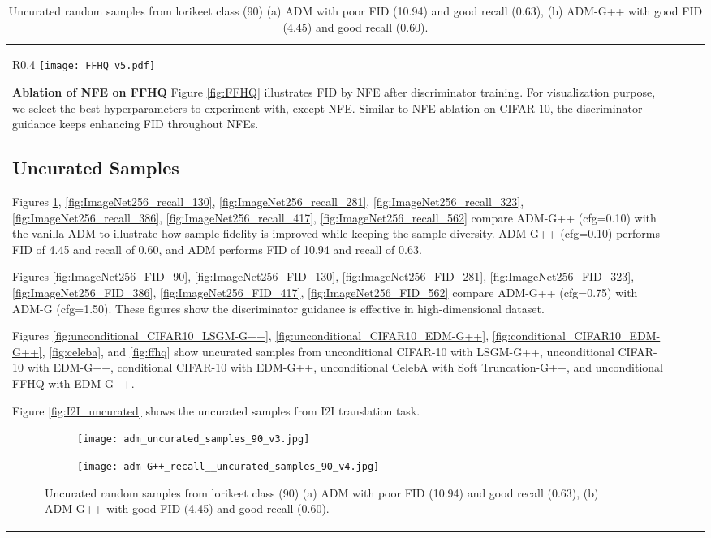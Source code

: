 \documentclass{article}
\theoremstyle{plain}
\theoremstyle{definition}
\theoremstyle{remark}
\begin{document}
\begin{table}[t]
\begin{tabular}{lccc}
{{\begin{wrapfigure}{R}{0.4\textwidth}
	\vskip -0.2in
	\centering
	\texttt{[image: FFHQ\_v5.pdf]}
	\caption{NFE ablation on FFHQ.}
	\vskip -0.3in
	\label{fig:FFHQ}
\end{wrapfigure}
\textbf{Ablation of NFE on FFHQ} Figure \ref{fig:FFHQ} illustrates FID by NFE after discriminator training. For visualization purpose, we select the best hyperparameters to experiment with, except NFE. Similar to NFE ablation on CIFAR-10, the discriminator guidance keeps enhancing FID throughout NFEs. 

\subsection{Uncurated Samples}\label{sec:uncurated}

Figures \ref{fig:ImageNet256_recall_90}, \ref{fig:ImageNet256_recall_130}, \ref{fig:ImageNet256_recall_281}, \ref{fig:ImageNet256_recall_323}, \ref{fig:ImageNet256_recall_386}, \ref{fig:ImageNet256_recall_417}, \ref{fig:ImageNet256_recall_562} compare ADM-G++ (cfg=0.10) with the vanilla ADM to illustrate how sample fidelity is improved while keeping the sample diversity. ADM-G++ (cfg=0.10) performs FID of 4.45 and recall of 0.60, and ADM performs FID of 10.94 and recall of 0.63.

Figures \ref{fig:ImageNet256_FID_90}, \ref{fig:ImageNet256_FID_130}, \ref{fig:ImageNet256_FID_281}, \ref{fig:ImageNet256_FID_323}, \ref{fig:ImageNet256_FID_386}, \ref{fig:ImageNet256_FID_417}, \ref{fig:ImageNet256_FID_562} compare ADM-G++ (cfg=0.75) with ADM-G (cfg=1.50). These figures show the discriminator guidance is effective in high-dimensional dataset. 

Figures \ref{fig:unconditional_CIFAR10_LSGM-G++}, \ref{fig:unconditional_CIFAR10_EDM-G++}, \ref{fig:conditional_CIFAR10_EDM-G++}, \ref{fig:celeba}, and \ref{fig:ffhq} show uncurated samples from unconditional CIFAR-10 with LSGM-G++, unconditional CIFAR-10 with EDM-G++, conditional CIFAR-10 with EDM-G++, unconditional CelebA with Soft Truncation-G++, and unconditional FFHQ with EDM-G++.

Figure \ref{fig:I2I_uncurated} shows the uncurated samples from I2I translation task.

\begin{figure}[t]
	\centering
	\begin{subfigure}{0.48\linewidth}
		\centering
		\texttt{[image: adm\_uncurated\_samples\_90\_v3.jpg]}
		\subcaption{ADM (FID 10.94 recall 0.63)}
	\end{subfigure}
	\hfil
	\begin{subfigure}{0.48\linewidth}
		\centering
		\texttt{[image: adm-G++\_recall\_\_uncurated\_samples\_90\_v4.jpg]}
		\subcaption{ADM-G++ (FID 4.45 recall 0.60)}
	\end{subfigure}
	\caption{Uncurated random samples from lorikeet class (90) (a) ADM with poor FID (10.94) and good recall (0.63), (b) ADM-G++ with good FID (4.45) and good recall (0.60).}
	\label{fig:ImageNet256_recall_90}
\end{figure}

}}
\end{tabular}
\end{table}
\end{document}
